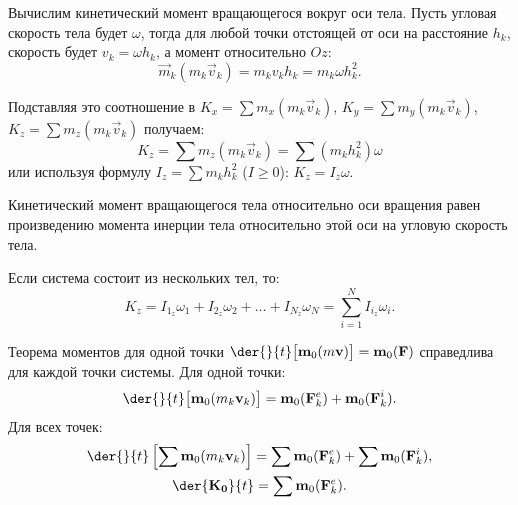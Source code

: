 Вычислим кинетический момент вращающегося вокруг оси тела. Пусть угловая
скорость тела будет \( \omega \), тогда для любой точки отстоящей от оси на
расстояние \( h_k \), скорость будет \( v_k = \omega h_k \), а момент
относительно \( Oz \):
\[
    \vec{m}_k(m_k\vec{v}_k) = m_k v_k h_k = m_k\omega h_k^2.
\]

Подставляя это соотношение в \( K_x = \sum m_x(m_k\vec{v}_k) \),
\( K_y = \sum m_y(m_k\vec{v}_k) \), \( K_z = \sum m_z(m_k\vec{v}_k) \) получаем:
\[
    K_z = \sum m_z(m_k\vec{v}_k) = \sum (m_k h_k^2)\omega
\] 
или используя формулу \( I_z = \sum m_k h_k^2 \) (\( I \ge 0 \)):
\( K_z = I_z\omega \).
 
Кинетический момент вращающегося тела относительно оси вращения равен
произведению момента инерции тела относительно этой оси на угловую скорость
тела.

Если система состоит из нескольких тел, то:
\[
    K_z = I_{1_z}\omega_1 + I_{2_z}\omega_2 + \ldots + I_{N_z}\omega_N =
    \sum_{i=1}^N I_{i_z}\omega_i.
\]
 
Теорема моментов для одной точки \( \ds \der{}{t}\bigl[\vec{m}_0(m\vec{v})\bigr]
= \vec{m}_0(\vec{F}) \) справедлива для каждой точки системы. Для одной точки:
\[
    \der{}{t}\bigl[\vec{m}_0(m_k\vec{v}_k)\bigr] = \vec{m}_0(\vec{F}^e_k) +
    \vec{m}_0(\vec{F}^i_k).
\]
Для всех точек:
\begin{gather*}
    \der{}{t}\left[\sum\vec{m}_0(m_k\vec{v}_k)\right] =
    \sum\vec{m}_0(\vec{F}^e_k) + \sum\vec{m}_0(\vec{F}^i_k), \\
    \der{\vec{K_0}}{t} = \sum\vec{m}_0(\vec{F}^e_k).
\end{gather*}

\newpage
